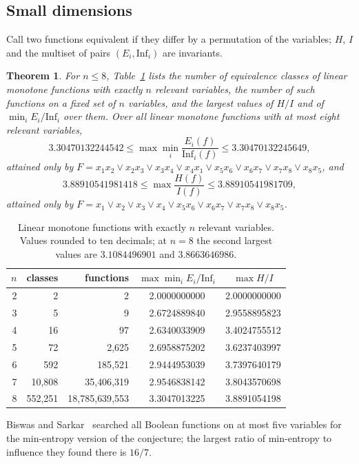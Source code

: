 \documentclass[11pt]{amsart}
\newtheorem{theorem}{Theorem}
\theoremstyle{remark}
\newcommand{\Inf}{\mathrm{Inf}}
\begin{document}
\subsection{Small dimensions}
Call two functions equivalent if they differ by a permutation of the variables; $H$, $I$ and the multiset of pairs
$(E_i,\Inf_i)$ are invariants.

\begin{theorem}\label{thm:census}
For $n\le8$, Table~\ref{tab:census} lists the number of equivalence classes of linear monotone functions with exactly $n$
relevant variables, the number of such functions on a fixed set of $n$ variables, and the largest values of $H/I$ and of
$\min_iE_i/\Inf_i$ over them. Over all linear monotone functions with at most eight relevant variables,
\[
3.30470132244542\le\max\min_i\frac{E_i(f)}{\Inf_i(f)}\le3.30470132245649,
\]
attained only by $F=x_1x_2\vee x_2x_3\vee x_3x_4\vee x_4x_1\vee x_5x_6\vee x_6x_7\vee x_7x_8\vee x_8x_5$, and
\[
3.88910541981418\le\max\frac{H(f)}{I(f)}\le3.88910541981709,
\]
attained only by $F=x_1\vee x_2\vee x_3\vee x_4\vee x_5x_6\vee x_6x_7\vee x_7x_8\vee x_8x_5$.
\end{theorem}

\begin{table}[tbp]
\centering
\begin{tabular}{rrrcc}
\toprule
$n$ & classes & functions & $\max\min_iE_i/\Inf_i$ & $\max H/I$\\\midrule
2 & 2 & 2 & 2.0000000000 & 2.0000000000\\
3 & 5 & 9 & 2.6724889840 & 2.9558895823\\
4 & 16 & 97 & 2.6340033909 & 3.4024755512\\
5 & 72 & 2{,}625 & 2.6958875202 & 3.6237403997\\
6 & 592 & 185{,}521 & 2.9444953039 & 3.7397640179\\
7 & 10{,}808 & 35{,}406{,}319 & 2.9546838142 & 3.8043570698\\
8 & 552{,}251 & 18{,}785{,}639{,}553 & 3.3047013225 & 3.8891054198\\
\bottomrule
\end{tabular}
\caption{Linear monotone functions with exactly $n$ relevant variables. Values rounded to ten decimals; at $n=8$ the
second largest values are $3.1084496901$ and $3.8663646986$.}\label{tab:census}
\end{table}

Biswas and Sarkar~\cite{BS} searched all Boolean functions on at most five variables for the min-entropy version of the
conjecture; the largest ratio of min-entropy to influence they found there is $16/7$.
\end{document}
